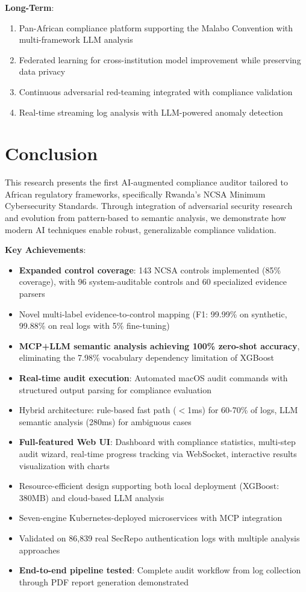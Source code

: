 \documentclass[11pt,conference]{IEEEtran}
\begin{document}
\textbf{Long-Term}:
\begin{enumerate}
    \item Pan-African compliance platform supporting the Malabo Convention with multi-framework LLM analysis
    \item Federated learning for cross-institution model improvement while preserving data privacy
    \item Continuous adversarial red-teaming integrated with compliance validation
    \item Real-time streaming log analysis with LLM-powered anomaly detection
\end{enumerate}

\section{Conclusion}

This research presents the first AI-augmented compliance auditor tailored to African regulatory frameworks, specifically Rwanda's NCSA Minimum Cybersecurity Standards. Through integration of adversarial security research and evolution from pattern-based to semantic analysis, we demonstrate how modern AI techniques enable robust, generalizable compliance validation.

\textbf{Key Achievements}:
\begin{itemize}
    \item \textbf{Expanded control coverage}: 143 NCSA controls implemented (85\% coverage), with 96 system-auditable controls and 60 specialized evidence parsers
    \item Novel multi-label evidence-to-control mapping (F1: 99.99\% on synthetic, 99.88\% on real logs with 5\% fine-tuning)
    \item \textbf{MCP+LLM semantic analysis achieving 100\% zero-shot accuracy}, eliminating the 7.98\% vocabulary dependency limitation of XGBoost
    \item \textbf{Real-time audit execution}: Automated macOS audit commands with structured output parsing for compliance evaluation
    \item Hybrid architecture: rule-based fast path ($<$1ms) for 60-70\% of logs, LLM semantic analysis (280ms) for ambiguous cases
    \item \textbf{Full-featured Web UI}: Dashboard with compliance statistics, multi-step audit wizard, real-time progress tracking via WebSocket, interactive results visualization with charts
    \item Resource-efficient design supporting both local deployment (XGBoost: 380MB) and cloud-based LLM analysis
    \item Seven-engine Kubernetes-deployed microservices with MCP integration
    \item Validated on 86,839 real SecRepo authentication logs with multiple analysis approaches
    \item \textbf{End-to-end pipeline tested}: Complete audit workflow from log collection through PDF report generation demonstrated
\end{itemize}
\end{document}

